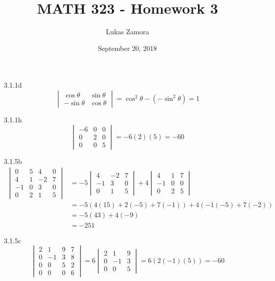 \documentclass{article}
\title{MATH 323 - Homework 3}
\author{Lukas Zamora}
\date{September 20, 2018}
\theoremstyle{definition}
\begin{document}
    \maketitle
    
    \begin{prob}{3.1.1d} $  $
    	\[
    		\begin{vmatrix} \cos\theta & \sin\theta \\ -\sin\theta & \cos\theta \end{vmatrix} = \cos^2\theta - (-\sin^2\theta) = \boxed{1}
    	\]
    \end{prob}

	\begin{prob}{3.1.1h} $  $ 
		\[
			\begin{vmatrix} -6 & 0 & 0 \\ 0 & 2 & 0 \\ 0 & 0 & 5 \end{vmatrix} = -6(2)(5) = \boxed{-60}
		\]
	\end{prob}

	\begin{prob}{3.1.5b} $  $ 
		\begin{align*}
			\begin{vmatrix} 0 & 5 & 4 & 0 \\ 4 & 1 & -2 & 7 \\ -1 & 0 & 3 & 0 \\ 0 & 2 & 1 & 5 \end{vmatrix} &= -5 \begin{vmatrix} 4 & -2 & 7 \\ -1 & 3 & 0 \\ 0 & 1 & 5 \end{vmatrix} + 4\begin{vmatrix} 4 & 1 & 7 \\ -1 & 0 & 0 \\ 0 & 2 & 5 \end{vmatrix} \\
			&= -5(4(15) + 2(-5) + 7(-1) ) + 4( -1(-5) + 7(-2) ) \\
			&= -5(43) + 4(-9) \\
			&= \boxed{-251}
		\end{align*}
	\end{prob}

	\begin{prob}{3.1.5c} $  $
		\[
			\begin{vmatrix} 2 & 1 & 9 & 7 \\ 0 & -1 & 3 & 8 \\ 0 & 0 & 5 & 2 \\ 0 & 0 & 0 & 6 \end{vmatrix} = 6 \begin{vmatrix} 2 & 1 & 9 \\ 0 & -1 & 3 \\ 0 & 0 & 5 \end{vmatrix} = 6(2(-1)(5)) = \boxed{-60}
		\]
	\end{prob}
\end{document}
